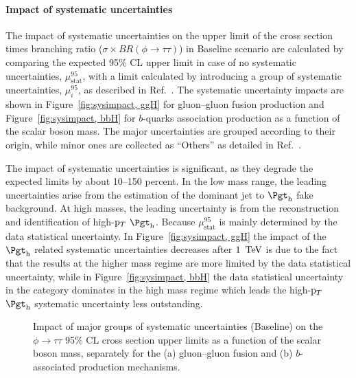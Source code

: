 \paragraph{Impact of systematic uncertainties}
The impact of systematic uncertainties on the upper limit of the cross section times branching ratio ($\sigma\times BR(\phi\to\tau\tau)$) in Baseline scenario are calculated by comparing the expected 95\% CL upper limit in case of no systematic uncertainties, $\mu^{95}_{\text{stat}}$, with a limit calculated by introducing a group of systematic uncertainties, $\mu^{95}_i$, as described in Ref.~\cite{ATLASRun2Ditau}. The systematic uncertainty impacts are shown in Figure~\ref{fig:sysimpact, ggH} for gluon--gluon fusion production and Figure~\ref{fig:sysimpact, bbH} for $b$-quarks association production as a function of the scalar boson mass. The major uncertainties are grouped according to their origin, while minor ones are collected as ``Others'' as detailed in Ref.~\cite{ATLASRun2Ditau}.

The impact of systematic uncertainties is significant, as they degrade the expected limits by about 10--150 percent. In the low mass range, the leading uncertainties arise from the estimation of the dominant jet to $\tauhad$ fake background. At high masses, the leading uncertainty is from the reconstruction and identification of high-$\mathrm{p}_{T}$ $\tauhad$. Because $\mu^{95}_{\text{stat}}$ is mainly determined by the data statistical uncertainty. In Figure~\ref{fig:sysimpact, ggH} the impact of the $\tauhad$ related systematic uncertainties decreases after $1~\,\text{Te\hspace{-.08em}V}$ is due to the fact that the results at the higher mass regime are more limited by the data statistical uncertainty, while in Figure~\ref{fig:sysimpact, bbH} the data statistical uncertainty in the \btag category dominates in the high mass regime which leads the high-$\mathrm{p}_{T}$ $\tauhad$ systematic uncertainty less outstanding.

\begin{figure}[!ht]
    \centering
        \qquad
        \caption{Impact of major groups of systematic uncertainties (Baseline) on the $\phi\to\tau\tau$ 95\% CL cross section upper limits as a function of the scalar boson mass, separately for the (a) gluon--gluon fusion and (b) $b$-associated production mechanisms.}
    \label{fig:sysimpact}
\end{figure}

